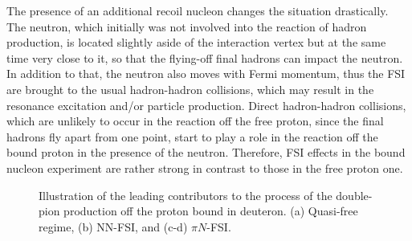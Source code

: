 The presence of an additional recoil nucleon changes the situation drastically. The neutron, which initially was not involved into the reaction of hadron production, is located slightly aside of the interaction vertex but at the same time very close to it, so that the flying-off final hadrons can impact the neutron. In addition to that, the neutron also moves with Fermi momentum, thus the FSI are brought to the usual hadron-hadron collisions, which may result in the resonance excitation and/or particle production. Direct hadron-hadron collisions, which are unlikely to occur in the reaction off the free proton, since the final hadrons fly apart from one point, start to play a role in the reaction off the bound proton in the presence of the neutron. Therefore, FSI effects in the bound nucleon experiment are rather strong in contrast to those in the free proton one.

\begin{figure}[!ht]
\begin{center}
\end{center}
\caption{\small Illustration of the leading contributors to the process of the double-pion production off the proton bound in deuteron. (a) Quasi-free regime, (b) NN-FSI, and (c-d) $\pi N$-FSI.}
\label{fig:fsi_mech}
\end{figure}

